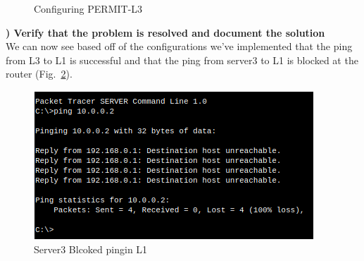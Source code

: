 \documentclass{report}
\newcommand{\mysubsection}[2]{\textbf{\romannumeral #1) #2}}
\begin{document}
\begin{figure}[!hbt]\centering
{}\hfill
{}\par 
{}
\caption{Configuring PERMIT-L3}\label{P3Config16}
\end{figure}




\noindent\mysubsection{3}{Verify that the problem is resolved and document the
solution}\\
We can now see based off of the configurations we've implemented that the ping
from L3 to L1 is successful and that the ping from server3 to L1 is blocked at the router
(Fig.~\ref{P3Verify16}).


\begin{figure}[!hbt]\centering
\includegraphics[width=.45\linewidth]{Figures/P3/Server3PinginL1.png}\par 
\caption{Server3 Blcoked pingin L1}\label{P3Verify16}
\end{figure}
\end{document}
